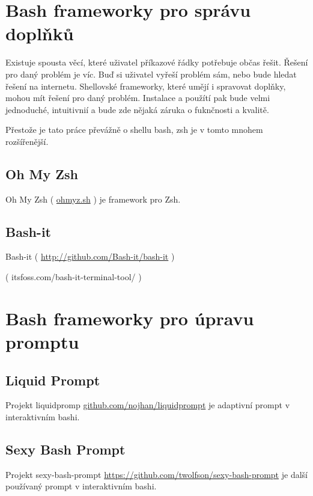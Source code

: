 \documentclass[thesis=M,czech]{FITthesis}[2012/06/26]
\begin{document}
%
%
%
%
%

\section{Bash frameworky pro správu doplňků}

Existuje spousta věcí, které uživatel příkazové řádky potřebuje občas řešit. Řešení pro daný problém je víc. Buď si uživatel vyřeší problém sám, nebo bude hledat řešení na internetu. Shellovské frameworky, které umějí i spravovat doplňky, mohou mít řešení pro daný problém. Instalace a použítí pak bude velmi jednoduché, intuitivnií a bude zde nějaká záruka o fuknčnosti a kvalitě.

Přestože je tato práce převážně o shellu bash, zsh je v tomto mnohem rozšířenější.

\subsection{Oh My Zsh}

Oh My Zsh ( \url{ohmyz.sh} ) je framework pro Zsh.

\subsection{Bash-it}

Bash-it ( \url{http://github.com/Bash-it/bash-it} )

( itsfoss.com/bash-it-terminal-tool/ ) 

%
%
%

\section{Bash frameworky pro úpravu promptu}

\subsection{Liquid Prompt}

Projekt liquidpromp \url{github.com/nojhan/liquidprompt} je adaptivní prompt v interaktivním bashi.

\subsection{Sexy Bash Prompt}

Projekt sexy-bash-prompt \url{https://github.com/twolfson/sexy-bash-prompt} je další používaný prompt v interaktivním bashi.
\end{document}
